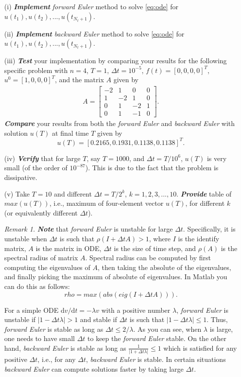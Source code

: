 \documentclass[11pt,a4paper]{article}
\newcommand{\dd}{\mathrm{d}}
\newcommand{\bfit}[1]{\textit{\textbf{#1}}}
\newcommand{\bmatx}[1]{\begin{bmatrix}
    #1
\end{bmatrix}}
\begin{document}
\begin{itemize}
\item[(i)] \bfit{Implement} {\it forward Euler} method to solve \eqref{eq:ode} for $u(t_1), u(t_2), ..., u(t_{N_t + 1})$.
\item[(ii)] \bfit{Implement} {\it backward Euler} method to solve \eqref{eq:ode} for $u(t_1), u(t_2), ..., u(t_{N_t + 1})$.
\item[(iii)] \bfit{Test} your implementation by comparing your results for the following specific problem with $n=4$, $T = 1$, $\Delta t = 10^{-5}$, $f(t) = [0, 0, 0, 0]^T$, $u^0 = [1, 0, 0, 0]^T$, and the matrix $A$ given by
\begin{align}
A = \bmatx{-2 & 1 & 0 & 0 \\ 1 & -2 & 1 & 0 \\ 0 & 1 & -2 & 1 \\ 0 & 1 & -1 & 0 }.
\end{align}
\bfit{Compare} your results from both the {\it forward Euler} and {\it backward Euler} with solution $u(T)$ at final time $T$ given by
\begin{equation}
u(T) = [0.2165, 0.1931, 0.1138, 0.1138]^T .
\end{equation}
\item[(iv)] \bfit{Verify} that for large $T$, say $T = 1000$, and $\Delta t = T/10^6$, $u(T)$ is very small (of the order of $10^{-87}$). This is due to the fact that the problem is dissipative. 
\item[(v)] Take $T = 10$ and different $\Delta t = T/2^k$, $k=1,2,3,...,10$.  \bfit{Provide} table of $max(u(T))$, i.e., maximum of four-element vector $u(T)$, for different $k$ (or equivalently different $\Delta t$). 

\noindent\textit{Remark 1.} \bfit{Note} that {\it forward Euler} is unstable for large $\Delta t$. Specifically, it is unstable when $\Delta t$ is such that $\rho(I + \Delta t A) > 1$, where $I$ is the identify matrix, $A$ is the matrix in ODE, $\Delta t$ is the size of time step, and $\rho(A)$ is the spectral radius of matrix $A$. Spectral radius can be computed by first computing the eigenvalues of $A$, then taking the absolute of the eigenvalues, and finally picking the maximum of absolute of eigenvalues. In Matlab you can do this as follows:
\begin{equation}
rho = max (abs(eig(I + \Delta t A))) .
\end{equation}

For a simple ODE $\dd v / \dd t = -\lambda v$ with a positive number $\lambda$,  {\it forward Euler} is unstable if $|1 - \Delta t \lambda | > 1$ and stable if $\Delta t$ is such that $|1 - \Delta t \lambda | \leq 1$. Thus, {\it forward Euler} is stable as long as $\Delta t \leq 2/\lambda$. As you can see, when $\lambda$ is large, one needs to have small $\Delta t$ to keep the {\it forward Euler} stable. On the other hand, {\it backward Euler} is stable as long as $\frac{1}{|1 + \Delta t \lambda|} \leq 1$ which is satisfied for any positive $\Delta t$, i.e., for any $\Delta t$, {\it backward Euler} is stable. In certain situations {\it backward Euler} can compute solutions faster by taking large $\Delta t$.
\end{itemize}
\end{document}
